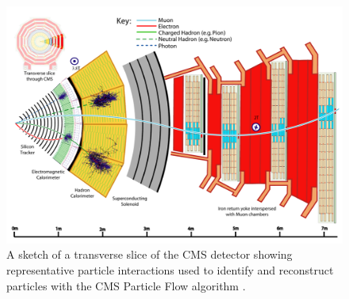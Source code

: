 \begin{figure}[hbtp]
\centering
\includegraphics[scale=0.5]{figures/lhc_and_cms/cms_slice.pdf}
\caption{A sketch of a transverse slice of the CMS detector showing representative particle interactions used to identify and reconstruct particles with the CMS Particle Flow algorithm \cite{cms_pf}.}
\label{cms_slice}
\end{figure}